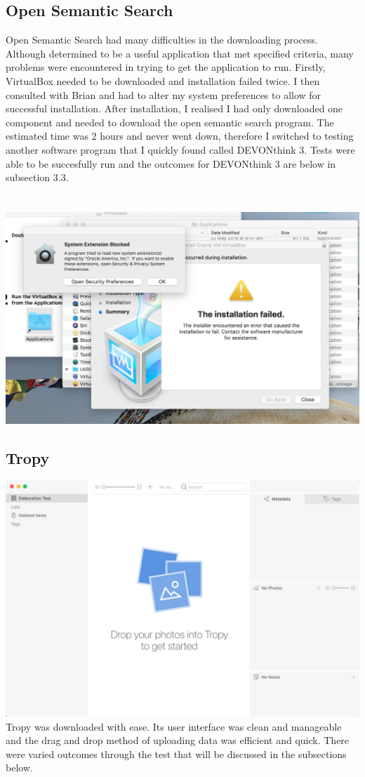 \documentclass{article}
\begin{document}
\subsection{Open Semantic Search}
Open Semantic Search had many difficulties in the downloading process. Although determined to be a useful application that met specified criteria, many problems were encountered in trying to get the application to run. Firstly, VirtualBox needed to be downloaded and installation failed twice. I then consulted with Brian and had to alter my system preferences to allow for successful installation. After installation, I realised I had only downloaded one component and needed to download the open semantic search program. The estimated time was 2 hours and never went down, therefore I switched to testing another software program that I quickly found called DEVONthink 3. Tests were able to be succesfully run and the outcomes for DEVONthink 3 are below in subsection 3.3. \\
\\
\\
\includegraphics[width=\textwidth]{OpenSemanticSearch.png} 

\clearpage
\subsection{Tropy}
\includegraphics[width=\textwidth]{TropyInterface.png}
\\
Tropy was downloaded with ease. Its user interface was clean and manageable and the drag and drop method of uploading data was efficient and quick. There were varied outcomes through the test that will be discussed in the subsections below. 
\end{document}
